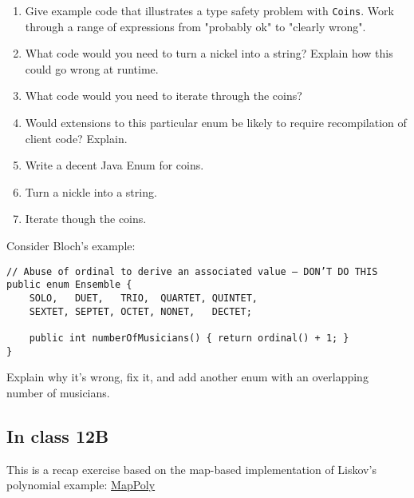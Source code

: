 \documentclass[11pt]{article}
\begin{document}
\begin{enumerate}
\item Give example code that illustrates a type safety problem with \texttt{Coins}. Work through a range of expressions from "probably ok" to "clearly wrong".
\item What code would you need to turn a nickel into a string? Explain how this could go wrong at runtime.
\item What code would you need to iterate through the coins?
\item Would extensions to this particular enum be likely to require recompilation of client code? Explain.
\item Write a decent Java Enum for coins.
\item Turn a nickle into a string.
\item Iterate though the coins.
\end{enumerate}


Consider Bloch's example:

\begin{verbatim}
// Abuse of ordinal to derive an associated value – DON’T DO THIS
public enum Ensemble {
    SOLO,   DUET,   TRIO,  QUARTET, QUINTET, 
    SEXTET, SEPTET, OCTET, NONET,   DECTET;

    public int numberOfMusicians() { return ordinal() + 1; }
}
\end{verbatim}

Explain why it's wrong, fix it, and add another enum with an overlapping number of musicians.

\subsection{In class 12B}
\label{sec:org0aeee0d}
This is a recap exercise based on the map-based implementation of Liskov's polynomial example: \href{./files/MapPoly.java}{MapPoly}
\end{document}
